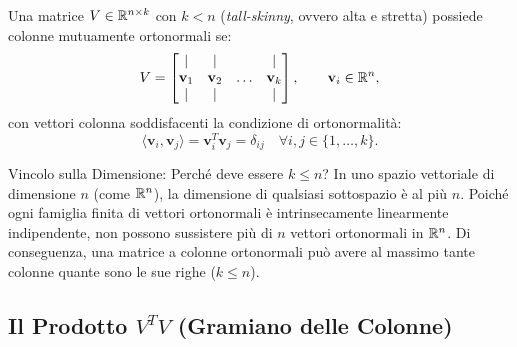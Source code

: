 \begin{definition}
Una matrice $V \in \mathbb{R}^{n \times k}$ con $k < n$ (\textit{tall-skinny}, ovvero alta e stretta) possiede colonne mutuamente ortonormali se:
\begin{equation}
    V = \begin{bmatrix} \mid & \mid & & \mid \\ \mathbf{v}_1 & \mathbf{v}_2 & \dots & \mathbf{v}_k \\ \mid & \mid & & \mid \end{bmatrix}, \qquad \mathbf{v}_i \in \mathbb{R}^n,
\end{equation}
con vettori colonna soddisfacenti la condizione di ortonormalit\`a:
\begin{equation}
    \langle \mathbf{v}_i, \mathbf{v}_j \rangle = \mathbf{v}_i^T \mathbf{v}_j = \delta_{ij} \quad \forall i, j \in \{1, \dots, k\}.
\end{equation}
\end{definition}

\begin{alertblock}{Vincolo sulla Dimensione: Perch\'e deve essere $k \le n$?}
In uno spazio vettoriale di dimensione $n$ (come $\mathbb{R}^n$), la dimensione di qualsiasi sottospazio \`e al pi\`u $n$. Poich\'e ogni famiglia finita di vettori ortonormali \`e intrinsecamente linearmente indipendente, non possono sussistere pi\`u di $n$ vettori ortonormali in $\mathbb{R}^n$. Di conseguenza, una matrice a colonne ortonormali pu\`o avere al massimo tante colonne quante sono le sue righe ($k \le n$).
\end{alertblock}

\subsection{Il Prodotto \texorpdfstring{$V^T V$}{V\textasciicircum T V} (Gramiano delle Colonne)}

